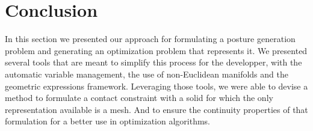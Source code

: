 \section{Conclusion}
\label{sec:conclusion_ch4}

In this section we presented our approach for formulating a posture generation problem and generating an optimization problem that represents it.
We presented several tools that are meant to simplify this process for the developper, with the automatic variable management, the use of non-Euclidean manifolds and the geometric expressions framework.
Leveraging those tools, we were able to devise a method to formulate a contact constraint with a solid for which the only representation available is a mesh.
And to ensure the continuity properties of that formulation for a better use in optimization algorithms.

